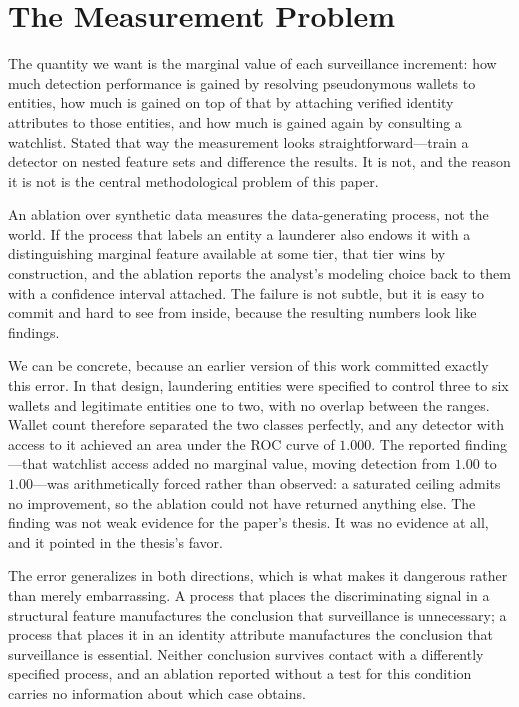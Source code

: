 \documentclass[11pt]{article}
\begin{document}
\section{The Measurement Problem}
\label{sec:measurement-problem}

The quantity we want is the marginal value of each surveillance increment: how much detection
performance is gained by resolving pseudonymous wallets to entities, how much is gained on top of
that by attaching verified identity attributes to those entities, and how much is gained again by
consulting a watchlist. Stated that way the measurement looks straightforward---train a detector on
nested feature sets and difference the results. It is not, and the reason it is not is the central
methodological problem of this paper.

An ablation over synthetic data measures the data-generating process, not the world. If the process
that labels an entity a launderer also endows it with a distinguishing marginal feature available at
some tier, that tier wins by construction, and the ablation reports the analyst's modeling choice
back to them with a confidence interval attached. The failure is not subtle, but it is easy to
commit and hard to see from inside, because the resulting numbers look like findings.

We can be concrete, because an earlier version of this work committed exactly this error. In that
design, laundering entities were specified to control three to six wallets and legitimate entities
one to two, with no overlap between the ranges. Wallet count therefore separated the two classes
perfectly, and any detector with access to it achieved an area under the ROC curve of $1.000$. The
reported finding---that watchlist access added no marginal value, moving detection from $1.00$ to
$1.00$---was arithmetically forced rather than observed: a saturated ceiling admits no improvement,
so the ablation could not have returned anything else. The finding was not weak evidence for the
paper's thesis. It was no evidence at all, and it pointed in the thesis's favor.

The error generalizes in both directions, which is what makes it dangerous rather than merely
embarrassing. A process that places the discriminating signal in a structural feature manufactures
the conclusion that surveillance is unnecessary; a process that places it in an identity attribute
manufactures the conclusion that surveillance is essential. Neither conclusion survives contact
with a differently specified process, and an ablation reported without a test for this condition
carries no information about which case obtains.
\end{document}
